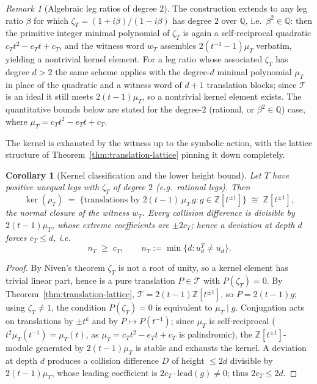 \documentclass[11pt]{article}
\theoremstyle{plain}
\newtheorem{corollary}[theorem]{Corollary}
\theoremstyle{definition}
\theoremstyle{remark}
\newtheorem{remark}[theorem]{Remark}
\begin{document}
\begin{remark}[Algebraic leg ratios of degree $2$]
\label{rem:algebraic-degree2}
The construction extends to any leg ratio $\beta$ for which
$\zeta_T = (1+i\beta)/(1-i\beta)$ has degree $2$ over $\mathbb{Q}$, i.e.\
$\beta^2 \in \mathbb{Q}$: then the primitive integer minimal polynomial
of $\zeta_T$ is again a self-reciprocal quadratic
$c_T t^2 - e_T t + c_T$, and the witness word $w_T$ assembles
$2(t^{-1}-1)\mu_T$ verbatim, yielding a nontrivial kernel element. For a
leg ratio whose associated $\zeta_T$ has degree $d > 2$ the same scheme
applies with the degree-$d$ minimal polynomial $\mu_T$ in place of the
quadratic and a witness word of $d+1$ translation blocks; since
$\mathcal{T}$ is an ideal it still meets $2(t-1)\mu_T$, so a nontrivial
kernel element exists. The quantitative bounds below are stated for the
degree-$2$ (rational, or $\beta^2 \in \mathbb{Q}$) case, where
$\mu_T = c_T t^2 - e_T t + c_T$.
\end{remark}

The kernel is exhausted by the witness up to the symbolic action, with
the lattice structure of Theorem~\ref{thm:translation-lattice} pinning it
down completely.

\begin{corollary}[Kernel classification and the lower height bound]
\label{cor:kernel-classification-restate}
Let $T$ have positive unequal legs with $\zeta_T$ of degree $2$ (e.g.\
rational legs). Then
\[
\ker(\rho_T) \;=\; \bigl\{\text{translations by }
2(t-1)\,\mu_T\, g : g \in \mathbb{Z}[t^{\pm 1}]\bigr\}
\;\cong\; \mathbb{Z}[t^{\pm 1}],
\]
the normal closure of the witness $w_T$. Every collision difference is
divisible by $2(t-1)\mu_T$, whose extreme coefficients are $\pm 2c_T$;
hence a deviation at depth $d$ forces $c_T \le d$, i.e.
\[
n_T \;\ge\; c_T,
\qquad n_T := \min\{d : u_d^T \neq u_d\}.
\]
\end{corollary}

\begin{proof}
By Niven's theorem $\zeta_T$ is not a root of unity, so a kernel element
has trivial linear part, hence is a pure translation $P \in \mathcal{T}$
with $P(\zeta_T) = 0$. By Theorem~\ref{thm:translation-lattice},
$\mathcal{T} = 2(t-1)\mathbb{Z}[t^{\pm 1}]$, so $P = 2(t-1)g$; using
$\zeta_T \neq 1$, the condition $P(\zeta_T)=0$ is equivalent to
$\mu_T \mid g$. Conjugation acts on translations by $\pm t^k$ and by
$P \mapsto P(t^{-1})$; since $\mu_T$ is self-reciprocal
($t^2 \mu_T(t^{-1}) = \mu_T(t)$, as $\mu_T = c_T t^2 - e_T t + c_T$ is
palindromic), the $\mathbb{Z}[t^{\pm 1}]$-module generated by
$2(t-1)\mu_T$ is stable and exhausts the kernel. A deviation at depth $d$
produces a collision difference $D$ of height $\le 2d$ divisible by
$2(t-1)\mu_T$, whose leading coefficient is
$2 c_T \cdot \mathrm{lead}(g) \neq 0$; thus $2 c_T \le 2d$.
\end{proof}
\end{document}
